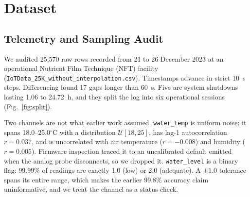 
\section{Dataset}\label{sec:dataset}

\subsection{Telemetry and Sampling Audit}
We audited 25,570 raw rows recorded from 21 to 26 December 2023 at an operational Nutrient Film Technique (NFT) facility (\texttt{IoTData\_25K\_without\_interpolation.csv}). Timestamps advance in strict 10~s steps. Differencing found 17 gaps longer than 60~s. Five are system shutdowns lasting 1.06 to 24.72~h, and they split the log into six operational sessions (Fig.~\ref{fig:split}).

Two channels are not what earlier work assumed. \texttt{water\_temp} is uniform noise: it spans 18.0--25.0$^\circ$C with a distribution $\mathcal{U}[18,25]$, has lag-1 autocorrelation $r=0.037$, and is uncorrelated with air temperature ($r=-0.008$) and humidity ($r=0.005$). Firmware inspection traced it to an uncalibrated default emitted when the analog probe disconnects, so we dropped it. \texttt{water\_level} is a binary flag: 99.99\% of readings are exactly 1.0 (low) or 2.0 (adequate). A $\pm1.0$ tolerance spans its entire range, which makes the earlier 99.8\% accuracy claim uninformative, and we treat the channel as a status check.

